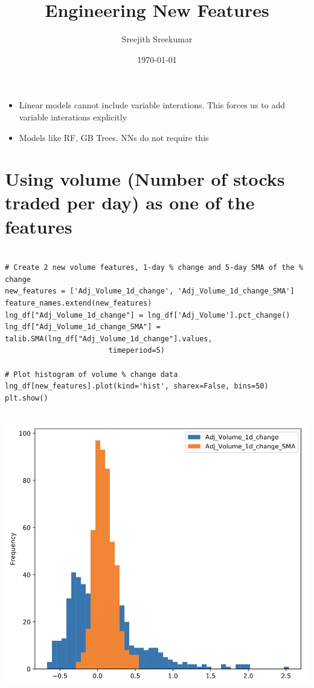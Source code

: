\documentclass[11pt]{article}
\author{Sreejith Sreekumar}
\date{\today}
\title{Engineering New Features}
\begin{document}
\maketitle
\tableofcontents

\begin{itemize}
\item Linear models cannot include variable interations. This forces us to add variable interations explicitly
\item Models like RF, GB Trees, NNs do not require this
\end{itemize}

\section{Using volume (Number of stocks traded per day) as one of the features}
\label{sec:orgdd39f29}

\begin{verbatim}

# Create 2 new volume features, 1-day % change and 5-day SMA of the % change
new_features = ['Adj_Volume_1d_change', 'Adj_Volume_1d_change_SMA']
feature_names.extend(new_features)
lng_df["Adj_Volume_1d_change"] = lng_df['Adj_Volume'].pct_change()
lng_df["Adj_Volume_1d_change_SMA"] = talib.SMA(lng_df["Adj_Volume_1d_change"].values,
                        timeperiod=5)

# Plot histogram of volume % change data
lng_df[new_features].plot(kind='hist', sharex=False, bins=50)
plt.show()


\end{verbatim}

\begin{center}
\includegraphics[width=.9\linewidth]{new-features.png}
\end{center}
\end{document}
